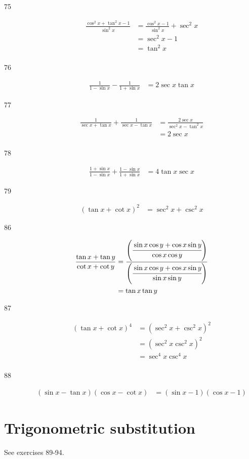 \documentclass{exam}
\begin{document}
\begin{description}
    \item[75]
      \begin{align*}
        \frac{\cos^2 x + \tan^2 x - 1}{\sin^2 x} & = \frac{\cos^2 x - 1}{\sin^2 x} + \sec^2 x \\
                                                 & =  \sec^2 x - 1 \\
                                                 & = \tan^2 x \\
      \end{align*}
        
    \item[76]
      \begin{align*}
        \frac{1}{1 - \sin x} - \frac{1}{1 + \sin x} &= 2 \sec x \tan x
      \end{align*}
        
    \item[77]
      \begin{align*}
        \frac{1}{\sec x + \tan x} + \frac{1}{\sec x - \tan x} & = \frac{2 \sec x }{\sec^2 x - \tan^2 x} \\
                                                              & = 2 \sec x \\
      \end{align*}

    \item[78]
      \begin{align*}
        \frac{1 + \sin x}{1 - \sin x} + \frac{1 - \sin x}{1 + \sin x} & = 4 \tan x \sec x
      \end{align*}

    \item[79]
      \begin{align*}
        (\tan x + \cot x)^2 &= \sec^2 x + \csc^2 x
      \end{align*}

    \item[86]
      \begin{align*}
        \frac{\tan x + \tan y}{\cot x + \cot y} &= 
          \frac{ \left( \cfrac{\sin x \cos y + \cos x \sin y }{\cos x \cos y} \right) }{ \left( \cfrac{\sin x \cos y + \cos x \sin y}{\sin x \sin y} \right)} \\
          &= \tan x \tan y \\
      \end{align*}

    \item[87]
      \begin{align*}
        (\tan x + \cot x)^4 & = \left( \sec^2 x + \csc^2 x \right)^2 \\
                            & = \left( \sec^2 x \csc^2 x \right)^2 \\
                            & = \sec^4 x \csc^4 x \\
      \end{align*}

    \item[88]
      \begin{align*}
        (\sin x - \tan x)(\cos x - \cot x) &= (\sin x - 1)(\cos x - 1)
      \end{align*}

  \end{description}
  \section{Trigonometric substitution}
  See exercises 89-94.  
\end{document}

